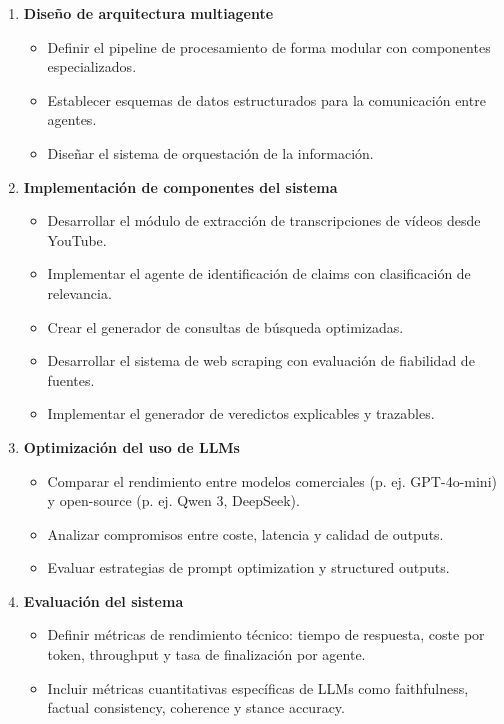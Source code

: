 \documentclass[12pt,a4paper]{article}
\begin{document}
\begin{enumerate}
    \item \textbf{Diseño de arquitectura multiagente}
    \begin{itemize}
        \item Definir el pipeline de procesamiento de forma modular con componentes especializados.
        \item Establecer esquemas de datos estructurados para la comunicación entre agentes.
        \item Diseñar el sistema de orquestación de la información.
    \end{itemize}
    \item \textbf{Implementación de componentes del sistema}
    \begin{itemize}
        \item Desarrollar el módulo de extracción de transcripciones de vídeos desde YouTube.
        \item Implementar el agente de identificación de claims con clasificación de relevancia.
        \item Crear el generador de consultas de búsqueda optimizadas.
        \item Desarrollar el sistema de web scraping con evaluación de fiabilidad de fuentes.
        \item Implementar el generador de veredictos explicables y trazables.
    \end{itemize}
    \item \textbf{Optimización del uso de LLMs}
    \begin{itemize}
        \item Comparar el rendimiento entre modelos comerciales (p. ej. GPT-4o-mini) y open-source (p. ej. Qwen 3, DeepSeek).
        \item Analizar compromisos entre coste, latencia y calidad de outputs.
        \item Evaluar estrategias de prompt optimization y structured outputs.
    \end{itemize}
    \item \textbf{Evaluación del sistema}
    \begin{itemize}
        \item Definir métricas de rendimiento técnico: tiempo de respuesta, coste por token, throughput y tasa de finalización por agente.
        \item Incluir métricas cuantitativas específicas de LLMs como faithfulness, factual consistency, coherence y stance accuracy.

\end{itemize}
\end{enumerate}
\end{document}
